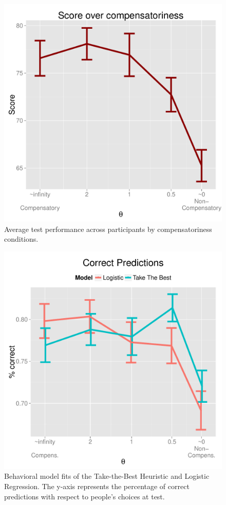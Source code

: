 \documentclass[10pt,letterpaper]{article}
\begin{document}
\begin{figure}[htb!]
	\centering
\caption{Average test performance across participants by compensatoriness conditions.}
	\label{performance}
	\centering
	\includegraphics[scale=0.4]{score.pdf}
	
\end{figure}
\begin{figure}[htb!]
	\centering
			\caption{Behavioral model fits of the Take-the-Best Heuristic and Logistic Regression. The y-axis represents the percentage of correct predictions with respect to people's choices at test.}
	\label{percentage}
	\centering
	\includegraphics[scale=0.4]{percentage.pdf}

\end{figure}
\end{document}
